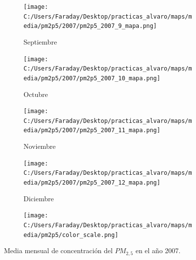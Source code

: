 \documentclass[12pt]{beamer}
\begin{document}
\begin{frame}[squeeze]
\begin{figure}[H]
\begin{subfigure}[H]{0.20\textwidth}
\texttt{[image: C:/Users/Faraday/Desktop/practicas\_alvaro/maps/media/pm2p5/2007/pm2p5\_2007\_9\_mapa.png]}
\captionsetup{labelformat=empty}
\caption{\scriptsize Septiembre}
\label{fig:map-pm2p5-2007-9}
\end{subfigure}
%
\begin{subfigure}[H]{0.20\textwidth}
\texttt{[image: C:/Users/Faraday/Desktop/practicas\_alvaro/maps/media/pm2p5/2007/pm2p5\_2007\_10\_mapa.png]}
\captionsetup{labelformat=empty}
\caption{\scriptsize Octubre}
\label{fig:map-pm2p5-2007-10}
\end{subfigure}
%
\begin{subfigure}[H]{0.20\textwidth}
\texttt{[image: C:/Users/Faraday/Desktop/practicas\_alvaro/maps/media/pm2p5/2007/pm2p5\_2007\_11\_mapa.png]}
\captionsetup{labelformat=empty}
\caption{\scriptsize Noviembre}
\label{fig:map-pm2p5-2007-11}
\end{subfigure}
%
\begin{subfigure}[H]{0.20\textwidth}
\texttt{[image: C:/Users/Faraday/Desktop/practicas\_alvaro/maps/media/pm2p5/2007/pm2p5\_2007\_12\_mapa.png]}
\captionsetup{labelformat=empty}
\caption{\scriptsize Diciembre}
\label{fig:map-pm2p5-2007-12}
\end{subfigure}

\begin{subfigure}[H]{0.45\textwidth}
\texttt{[image: C:/Users/Faraday/Desktop/practicas\_alvaro/maps/media/pm2p5/color\_scale.png]}
\captionsetup{labelformat=empty}
\caption{}
\end{subfigure}

\vspace*{-7mm}
\caption{\scriptsize Media mensual de concentración del $PM_{2,5}$ en el año 2007.}
\label{fig:map-pm2p5-2007}
\end{figure}
\end{frame}
\end{document}
